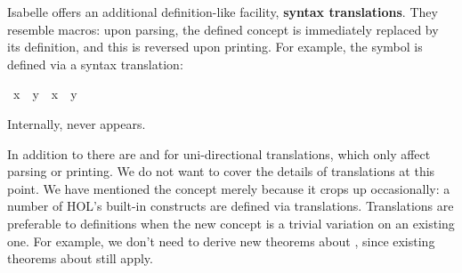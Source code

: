 %
\begin{isabellebody}%
\def\isabellecontext{Translations}%
%
%
\begin{isamarkuptext}%
\label{sec:def-translations}
Isabelle offers an additional definition-like facility,
\textbf{syntax translations}.
They resemble macros: upon parsing, the defined concept is immediately
replaced by its definition, and this is reversed upon printing. For example,
the symbol \isa{{\isasymnoteq}} is defined via a syntax translation:%
\end{isamarkuptext}%
\ {\isachardoublequote}x\ {\isasymnoteq}\ y{\isachardoublequote}\ {\isasymrightleftharpoons}\ {\isachardoublequote}{\isasymnot}{\isacharparenleft}x\ {\isacharequal}\ y{\isacharparenright}{\isachardoublequote}%
\begin{isamarkuptext}%
\noindent
Internally, \isa{{\isasymnoteq}} never appears.

In addition to \isa{{\isasymrightleftharpoons}} there are
\isa{{\isasymrightharpoonup}}
and \isa{{\isasymleftharpoondown}}
for uni-directional translations, which only affect
parsing or printing.  We do not want to cover the details of
translations at this point.  We have mentioned the concept merely because it
crops up occasionally: a number of HOL's built-in constructs are defined
via translations.  Translations are preferable to definitions when the new 
concept is a trivial variation on an existing one.  For example, we
don't need to derive new theorems about \isa{{\isasymnoteq}}, since existing theorems
about \isa{{\isacharequal}} still apply.%
\end{isamarkuptext}%
\end{isabellebody}%

